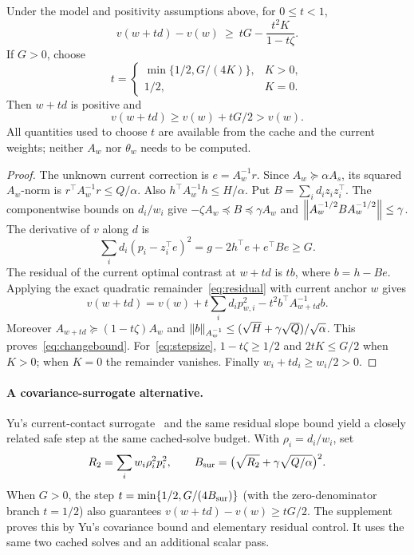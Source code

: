 \documentclass[11pt]{article}
\begin{document}
\begin{theorem}\label{thm:safe}
Under the model and positivity assumptions above, for $0\le t<1$,
\begin{equation}\label{eq:changebound}
 v(w+td)-v(w)\ \ge\ tG-\frac{t^2K}{1-t\zeta}.
\end{equation}
If $G>0$, choose
\begin{equation}\label{eq:stepsize}
 t=\begin{cases}
 \min\{1/2,G/(4K)\},&K>0,\\
 1/2,&K=0.
 \end{cases}
\end{equation}
Then $w+td$ is positive and
\begin{equation}\label{eq:gain}
 v(w+td)\ge v(w)+tG/2>v(w).
\end{equation}
All quantities used to choose $t$ are available from the cache and the current weights; neither $A_w$ nor $\theta_w$ needs to be computed.
\end{theorem}

\begin{proof}
The unknown current correction is $e=A_w^{-1}r$.
Since $A_w\succeq\alpha A_s$, its squared $A_w$-norm is
$r^\top A_w^{-1}r\le Q/\alpha$.
Also $h^\top A_w^{-1}h\le H/\alpha$.
Put $B=\sum_i d_i z_i z_i^\top$.
The componentwise bounds on $d_i/w_i$ give
$-\zeta A_w\preceq B\preceq\gamma A_w$ and
$\left\lVert A_w^{-1/2}BA_w^{-1/2}\right\rVert\le\gamma$.
The derivative of $v$ along $d$ is
\[
 \sum_i d_i(p_i-z_i^\top e)^2
 =g-2h^\top e+e^\top Be\ge G.
\]
The residual of the current optimal contrast at $w+td$ is
$t b$, where $b=h-Be$.
Applying the exact quadratic remainder~\eqref{eq:residual} with current anchor $w$ gives
\[
 v(w+td)=v(w)+t\sum_id_ip_{w,i}^2
            -t^2b^\top A_{w+td}^{-1}b.
\]
Moreover $A_{w+td}\succeq(1-t\zeta)A_w$ and
$\left\lVert b\right\rVert_{A_w^{-1}}\le(\sqrt H+\gamma\sqrt Q)/\sqrt\alpha$.
This proves~\eqref{eq:changebound}. For~\eqref{eq:stepsize},
$1-t\zeta\ge1/2$ and $2tK\le G/2$ when $K>0$; when $K=0$ the remainder vanishes.
Finally $w_i+td_i\ge w_i/2>0$.
\end{proof}

\paragraph{A covariance-surrogate alternative.}
Yu's current-contact surrogate~\cite{yu2010} and the same residual slope bound yield a closely related safe step at the same cached-solve budget. With $\rho_i=d_i/w_i$, set
\[
 R_2=\sum_iw_i\rho_i^2p_i^2,\qquad
 B_{\rm sur}=\bigl(\sqrt{R_2}+\gamma\sqrt{Q/\alpha}\bigr)^2.
\]
When $G>0$, the step $t=\min\{1/2,G/(4B_{\rm sur})\}$ (with the zero-denominator branch $t=1/2$) also guarantees $v(w+td)-v(w)\ge tG/2$. The supplement proves this by Yu's covariance bound and elementary residual control. It uses the same two cached solves and an additional scalar pass.
\end{document}
